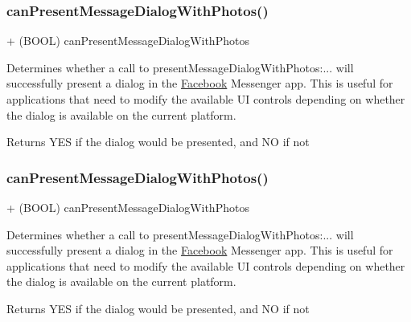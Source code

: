 \subsubsection{\texorpdfstring{can\+Present\+Message\+Dialog\+With\+Photos()}{canPresentMessageDialogWithPhotos()}\hspace{0.1cm}{\footnotesize\ttfamily [4/5]}}
{\footnotesize\ttfamily + (B\+O\+OL) can\+Present\+Message\+Dialog\+With\+Photos \begin{DoxyParamCaption}{ }\end{DoxyParamCaption}}

Determines whether a call to {\ttfamily present\+Message\+Dialog\+With\+Photos\+:...} will successfully present a dialog in the \hyperlink{interfaceFacebook}{Facebook} Messenger app. This is useful for applications that need to modify the available UI controls depending on whether the dialog is available on the current platform.

\begin{DoxyReturn}{Returns}
Y\+ES if the dialog would be presented, and NO if not 
\end{DoxyReturn}
\mbox{\label{interfaceFBDialogs_ac10e310c30d763c7885c11fb44ac4924}} 
\subsubsection{\texorpdfstring{can\+Present\+Message\+Dialog\+With\+Photos()}{canPresentMessageDialogWithPhotos()}\hspace{0.1cm}{\footnotesize\ttfamily [5/5]}}
{\footnotesize\ttfamily + (B\+O\+OL) can\+Present\+Message\+Dialog\+With\+Photos \begin{DoxyParamCaption}{ }\end{DoxyParamCaption}}

Determines whether a call to {\ttfamily present\+Message\+Dialog\+With\+Photos\+:...} will successfully present a dialog in the \hyperlink{interfaceFacebook}{Facebook} Messenger app. This is useful for applications that need to modify the available UI controls depending on whether the dialog is available on the current platform.

\begin{DoxyReturn}{Returns}
Y\+ES if the dialog would be presented, and NO if not 
\end{DoxyReturn}
\mbox{\label{interfaceFBDialogs_a4239a93d5d1b150b93cf589bca6f46e1}} 
